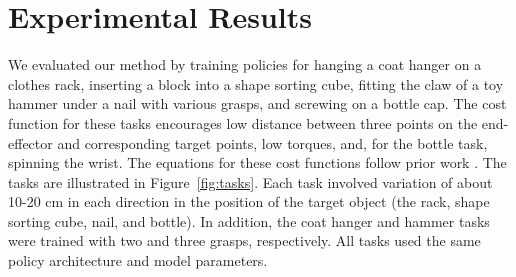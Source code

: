 \documentclass[final]{IEEEtran}
\begin{document}
\section{Experimental Results}
\label{sec:results}

We evaluated our method by training policies for hanging a coat hanger on a clothes rack, inserting a block into a shape sorting cube, fitting the claw of a toy hammer under a nail with various grasps, and screwing on a bottle cap. The cost function for these tasks encourages low distance between three points on the end-effector and corresponding target points, low torques, and, for the bottle task, spinning the wrist. The equations for these cost functions follow prior work \cite{lwa-lnnpg-15}. The tasks are illustrated in Figure~\ref{fig:tasks}. Each task involved variation of about 10-20 cm in each direction in the position of the target object (the rack, shape sorting cube, nail, and bottle). In addition, the coat hanger and hammer tasks were trained with two and three grasps, respectively. All tasks used the same policy architecture and model parameters.
\end{document}
